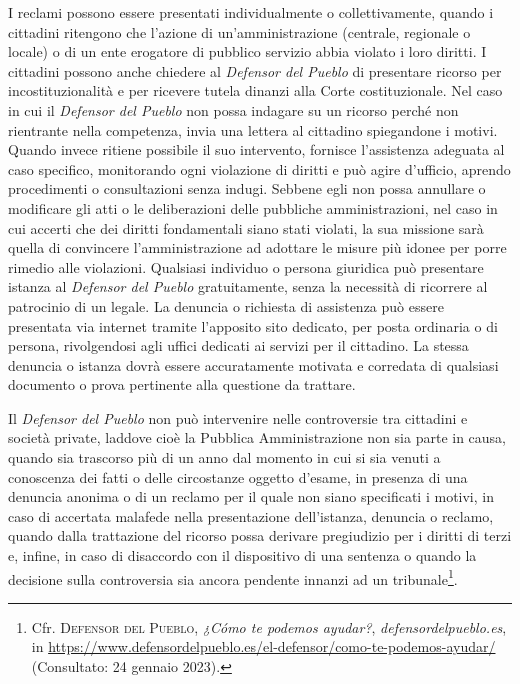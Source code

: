 \documentclass[12pt,it,a4paper,]{report}
\begin{document}
I reclami possono essere presentati individualmente o collettivamente,
quando i cittadini ritengono che l'azione di un'amministrazione
(centrale, regionale o locale) o di un ente erogatore di pubblico
servizio abbia violato i loro diritti. I cittadini possono anche
chiedere al \emph{Defensor del Pueblo} di presentare ricorso per
incostituzionalità e per ricevere tutela dinanzi alla Corte
costituzionale. Nel caso in cui il \emph{Defensor del Pueblo} non possa
indagare su un ricorso perché non rientrante nella competenza, invia una
lettera al cittadino spiegandone i motivi. Quando invece ritiene
possibile il suo intervento, fornisce l'assistenza adeguata al caso
specifico, monitorando ogni violazione di diritti e può agire d'ufficio,
aprendo procedimenti o consultazioni senza indugi. Sebbene egli non
possa annullare o modificare gli atti o le deliberazioni delle pubbliche
amministrazioni, nel caso in cui accerti che dei diritti fondamentali
siano stati violati, la sua missione sarà quella di convincere
l'amministrazione ad adottare le misure più idonee per porre rimedio
alle violazioni. Qualsiasi individuo o persona giuridica può presentare
istanza al \emph{Defensor del Pueblo} gratuitamente, senza la necessità
di ricorrere al patrocinio di un legale. La denuncia o richiesta di
assistenza può essere presentata via internet tramite l'apposito sito
dedicato, per posta ordinaria o di persona, rivolgendosi agli uffici
dedicati ai servizi per il cittadino. La stessa denuncia o istanza dovrà
essere accuratamente motivata e corredata di qualsiasi documento o prova
pertinente alla questione da trattare.

Il \emph{Defensor del Pueblo} non può intervenire nelle controversie tra
cittadini e società private, laddove cioè la Pubblica Amministrazione
non sia parte in causa, quando sia trascorso più di un anno dal momento
in cui si sia venuti a conoscenza dei fatti o delle circostanze oggetto
d'esame, in presenza di una denuncia anonima o di un reclamo per il
quale non siano specificati i motivi, in caso di accertata malafede
nella presentazione dell'istanza, denuncia o reclamo, quando dalla
trattazione del ricorso possa derivare pregiudizio per i diritti di
terzi e, infine, in caso di disaccordo con il dispositivo di una
sentenza o quando la decisione sulla controversia sia ancora pendente
innanzi ad un tribunale\footnote{Cfr. \textsc{Defensor del Pueblo},
  \emph{¿Cómo te podemos ayudar?}, \emph{defensordelpueblo.es}, in
  \url{https://www.defensordelpueblo.es/el-defensor/como-te-podemos-ayudar/}
  (Consultato: 24 gennaio 2023).}.
\end{document}

